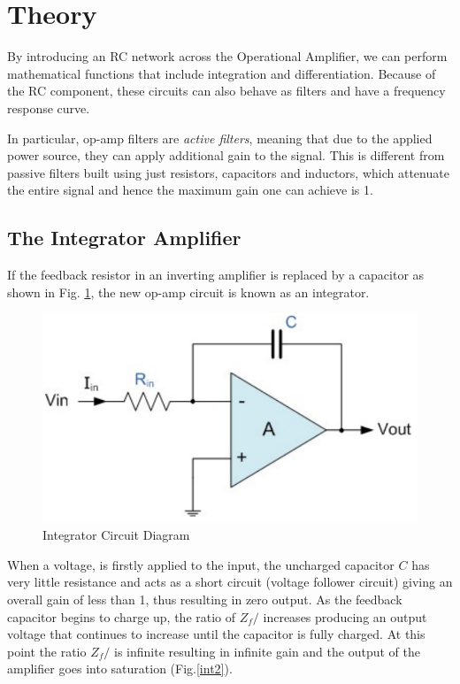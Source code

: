 \section{Theory}

By introducing an RC network across the Operational Amplifier, we can perform mathematical functions that include integration and differentiation. Because of the RC component, these circuits can also behave as filters and have a frequency response curve. 

In particular, op-amp filters are \textit{active filters}, meaning that due to the applied power source, they can apply additional gain to the signal. This is different from passive filters built using just resistors, capacitors and inductors, which attenuate the entire signal and hence the maximum gain one can achieve is 1.  


\subsection{The Integrator Amplifier}

If the feedback resistor in an inverting amplifier is replaced by a capacitor as shown in Fig. \ref{int1}, the new op-amp circuit is known as an integrator.

\begin{figure}[H]
    \centering
    \includegraphics[width=0.6\columnwidth]{images/integrator.png}
    \caption{Integrator Circuit Diagram}
    \label{int1}
\end{figure}

When a voltage,  is firstly applied to the input, the uncharged capacitor $C$ has very little resistance and acts as a short circuit (voltage follower circuit) giving an overall gain of less than 1, thus resulting in zero output.
As the feedback capacitor begins to charge up, the ratio of $Z_f/$ increases producing an output voltage that continues to increase until the capacitor is fully charged. At this point the ratio $Z_f/$ is infinite resulting in infinite gain and the output of the amplifier goes into saturation (Fig.\ref{int2}).

